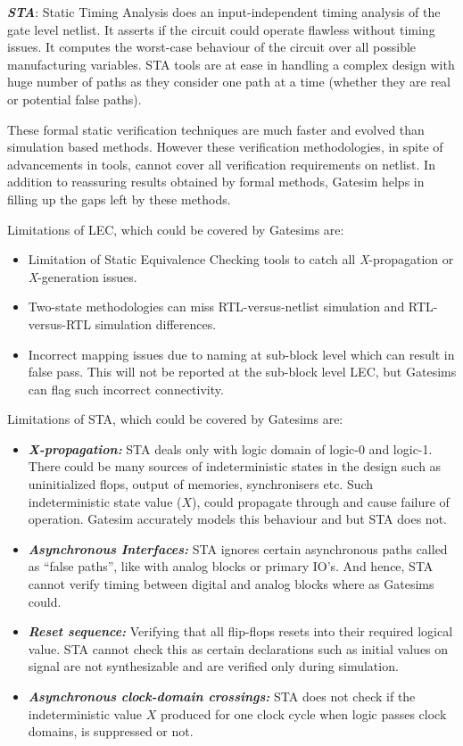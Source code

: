 \emph {\bf STA}: Static Timing Analysis does an input-independent timing analysis of the gate level netlist. It asserts if the circuit could operate flawless without timing issues. It computes the worst-case behaviour of the circuit over all possible manufacturing variables. STA tools are at ease in handling a complex design with huge number of paths as they consider one path at a time (whether they are real or potential false paths). 



These formal static verification techniques are much faster and evolved than simulation based methods. However these verification methodologies, in spite of advancements in tools, cannot cover all verification requirements on netlist. In addition to reassuring results obtained by formal methods, Gatesim helps in filling up the gaps left by these methods. 

Limitations of LEC, which could be covered by Gatesims are:
\begin{itemize}
	\item Limitation of Static Equivalence Checking tools to catch all {\it X}-propagation or {\it X}-generation issues.
	\item Two-state methodologies can miss RTL-versus-netlist simulation and RTL-versus-RTL simulation differences.
	\item Incorrect mapping issues due to naming at sub-block level which can result in false pass. This will not be reported at the sub-block level LEC, but Gatesims can flag such incorrect connectivity.
\end{itemize}

Limitations of STA, which could be covered by Gatesims are:
\begin{itemize}
	\item \emph{\bf X-propagation:} STA deals only with logic domain of logic-0 and logic-1. There could be many sources of indeterministic states in the design such as uninitialized flops, output of memories, synchronisers etc. Such indeterministic state value ($X$), could propagate through and cause failure of operation. Gatesim accurately models this behaviour and but STA does not.
	\item \emph{\bf Asynchronous Interfaces:} STA ignores certain asynchronous paths called as ``false paths'', like with analog blocks or primary IO's. And hence, STA cannot verify timing between digital and analog blocks where as Gatesims could.
	\item \emph{\bf Reset sequence:} Verifying that all flip-flops resets into their required logical value. STA cannot check this as certain declarations such as initial values on signal are not synthesizable and are verified only during simulation.
	\item \emph{\bf Asynchronous clock-domain crossings:} STA does not check if the indeterministic value $X$ produced for one clock cycle when logic passes clock domains, is suppressed or not.
\end{itemize}


